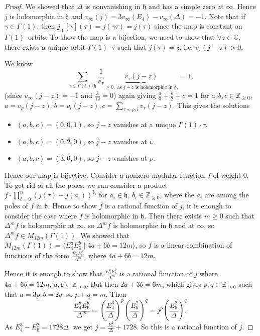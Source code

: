 \documentclass{article}
\theoremstyle{definition}
\begin{document}
\begin{proof}
    We showed that $\Delta$ is nonvanishing in $\mathfrak{h}$ and has a simple zero at $\infty$. Hence $j$ is holomorphic in $\mathfrak{h}$ and $v_{\infty}(j)=3v_{\infty}(E_4)-v_{\infty}(\Delta) = -1$. Note that if $\gamma \in \Gamma(1)$, then $j|_0[\gamma](\tau) = j(\gamma \tau) = j(\tau)$ since the map is constant on $\Gamma(1)$--orbits. To show the map is a bijection, we need to show that $\forall z \in \mathbb{C}$, there exists a unique orbit $\Gamma(1)\cdot \tau$ such that $j(\tau)=z$, i.e. $v_\tau(j-z)>0$. \vspace{1mm}
     
    We know \[
    \sum_{\tau \in \Gamma(1)\setminus \mathfrak{h}}^{} \frac{1}{e_{\tau}} \underbrace{v_{\tau}(j-z)}_{\ge 0, \text{ as }j-z \text{ is holomorphic in }\mathfrak{h}.} = 1,
    \]
    (since $v_{\infty}(j-z) = -1$ and $\frac{k}{12}= 0$) again giving $\frac{a}{3} +\frac{b}{2}+c= 1$ for $a,b,c \in \mathbb{Z}_{\ge 0}$, $ a = v_{\rho}(j-z), b = v_{i}(j-z), c = \sum_{\tau \not\sim \rho,i}^{} v_\tau(j-z)$. This gives the solutions 
    \begin{itemize}
        \item $(a,b,c) = (0,0,1)$, so $j-z$ vanishes at a unique $\Gamma(1)\cdot \tau$.
        \item $(a,b,c) = (0,2,0)$, so $j-z$ vanishes at $i$.
        \item $(a,b,c) = (3,0,0)$, so $j-z$ vanishes at $\rho$.
    \end{itemize}
    Hence our map is bijective. Consider a nonzero modular function $f$ of weight 0. To get rid of all the poles, we can consider a product $f \cdot \prod_{i=0}^{n} \left(j(\tau)-j(a_i)\right)^{b_i}$ for $a_i \in \mathfrak{h}$, $b_i \in \mathbb{Z}_{\ge 0}$, where the $a_i$ are among the poles of $f$ in $\mathfrak{h}$. Hence to show $f$ is a rational function of $j$, it is enough to consider the case where $f$ is holomorphic in $\mathfrak{h}$. Then there exists $m\ge 0$ such that $\Delta^m f$ is holomorphic at $\infty$, so $\Delta^m f$ is holomorphic in $\mathfrak{h}$ and at $\infty$, so $\Delta^m f \in M_{12m}(\Gamma(1))$. We showed that $M_{12m}(\Gamma(1)) = \langle E_4^a E_6^b \mid 4a+6b=12m \rangle$, so $f$ is a linear combination of functions of the form $\frac{E_4^aE_6^b}{\Delta^m}$, where $4a+6b=12m$. 
    \vspace{1mm}
     
    Hence it is enough to show that $\frac{E_4^aE_6^b}{\Delta^m}$ is a rational function of $j$ where $4a+6b=12m$, $a,b \in \mathbb{Z}_{\ge 0}$. But then $2a+3b=6m$, which gives $p,q \in \mathbb{\mathbb{Z}}_{\ge 0}$ such that $a =3p, b = 2q$, so $p+q=m$. Then $$\frac{E_4^aE_6^b}{\Delta^m} = \left(\frac{E_4^3}{\Delta}\right)^p \left(\frac{E_6^2}{\Delta}\right)^q = j^p \left(\frac{E_6^2}{\Delta}\right)^q.$$ 
    As $E_4^3 - E_6^2 = 1728\Delta$, we get $j = \frac{E_6^2}{\Delta} + 1728$. So this is a rational function of $j$.
\end{proof}
\end{document}
